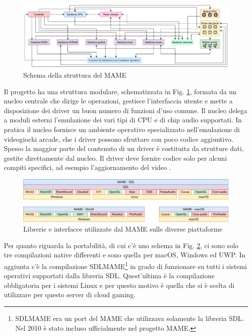 \begin{figure}[H]
	\includegraphics[width=\linewidth]{immagini/mame_schema_moduli_d}
	\caption{Schema della struttura del MAME}
	\label{fig:mame_schema_moduli_d}
\end{figure}

Il progetto ha una struttura modulare, schematizzata in Fig. \ref{fig:mame_schema_moduli_d}, formata da un nucleo centrale che dirige le operazioni, gestisce l'interfaccia utente e mette a disposizione dei driver un buon numero di funzioni d'uso comune. Il nucleo delega a moduli esterni l'emulazione dei vari tipi di CPU e di chip audio supportati. In pratica il nucleo fornisce un ambiente operativo specializzato nell'emulazione di videogiochi arcade, che i driver possono sfruttare con poco codice aggiuntivo. Spesso la maggior parte del contenuto di un driver è costituita da strutture dati, gestite direttamente dal nucleo. Il driver deve fornire codice solo per alcuni compiti specifici, ad esempio l'aggiornamento del video \parencite{Il_progetto_MAME}.

\begin{figure}[H]
	\includegraphics[width=\linewidth]{immagini/mame_architettura_full}
	\caption{Librerie e interfacce utilizzate dal MAME sulle diverse piattaforme}
	\label{fig:mame_architettura_full}
\end{figure}

Per quanto riguarda la portabilità, di cui c'è uno schema in Fig. \ref{fig:mame_architettura_full}, ci sono solo tre compilazioni native differenti e sono quella per macOS, Windows ed UWP. In aggiunta c'è la compilazione SDLMAME\footnote{SDLMAME era un port del MAME che utilizzava solamente la libreria SDL. Nel 2010 è stato incluso ufficialmente nel progetto MAME.} in grado di funzionare su tutti i sistemi operativi supportati dalla libreria SDL. Quest'ultima è la compilazione obbligatoria per i sistemi Linux e per questo motivo è quella che si è scelta di utilizzare per questo server di cloud gaming.

